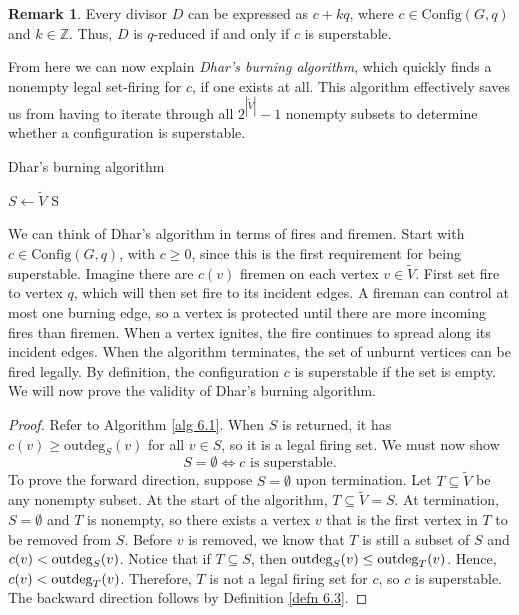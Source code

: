 \documentclass[openany, amssymb, psamsfonts]{amsart}
\theoremstyle{definition}
\newtheorem{rem}{Remark}[section]
\numberwithin{equation}{section}
\begin{document}
\begin{rem}
\label{rem 6.1}
Every divisor $D$ can be expressed as $c+kq$, where $c\in \text{Config}(G,q)$ and $k\in \mathbb{Z}$. Thus, $D$ is $q$-reduced if and only if $c$ is superstable. 
\end{rem}

From here we can now explain \textit{Dhar's burning algorithm}, which quickly finds a nonempty legal set-firing for $c$, if one exists at all. This algorithm effectively saves us from having to iterate through all $2^{|\tilde{V}|}-1$ nonempty subsets to determine whether a configuration is superstable.

\begin{algorithm}
\caption{Dhar's burning algorithm}\label{alg 6.1}
$S \gets \tilde{V}$\;
\Return S\;
\end{algorithm}

We can think of Dhar's algorithm in terms of fires and firemen. Start with $c\in \text{Config}(G,q)$, with $c\geq 0$, since this is the first requirement for being superstable. Imagine there are $c(v)$ firemen on each vertex $v\in \tilde{V}$. First set fire to vertex $q$, which will then set fire to its incident edges. A fireman can control at most one burning edge, so a vertex is protected until there are more incoming fires than firemen. When a vertex ignites, the fire continues to spread along its incident edges. When the algorithm terminates, the set of unburnt vertices can be fired legally. By definition, the configuration $c$ is superstable if the set is empty. We will now prove the validity of Dhar's burning algorithm.

\begin{proof}
Refer to Algorithm \ref{alg 6.1}. When $S$ is returned, it has $c(v)\geq \text{outdeg}_S(v)$ for all $v\in S$, so it is a legal firing set. We must now show 
\[S=\emptyset \Longleftrightarrow c \text{ is superstable}.\]
To prove the forward direction, suppose $S=\emptyset$ upon termination. Let $T\subseteq\tilde{V}$ be any nonempty subset. At the start of the algorithm, $T\subseteq\tilde{V}=S$. At termination, $S=\emptyset$ and $T$ is nonempty, so there exists a vertex $v$ that is the first vertex in $T$ to be removed from $S$. Before $v$ is removed, we know that $T$ is still a subset of $S$ and $c(v)<\textup{outdeg}_S(v)$. Notice that if $T\subseteq S$, then $\textup{outdeg}_S(v)\leq \textup{outdeg}_T(v)$. Hence, $c(v)<\textup{outdeg}_T(v)$. Therefore, $T$ is not a legal firing set for $c$, so $c$ is superstable. The backward direction follows by Definition \ref{defn 6.3}.
\end{proof}
\end{document}
